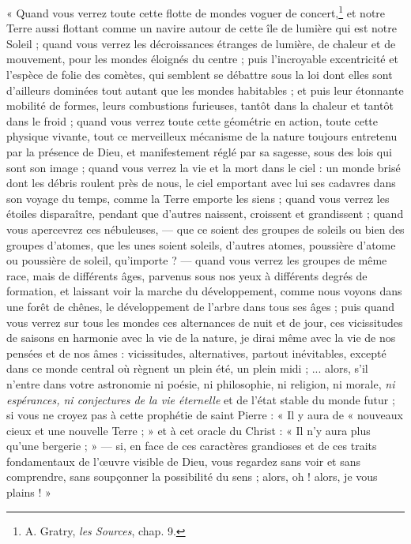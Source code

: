 \documentclass[a4paper, 11pt, oneside]{article}
\begin{document}
« Quand vous verrez toute cette flotte de mondes voguer de concert,\footnote{A. Gratry, \emph{les Sources}, chap. 9.} et notre Terre aussi flottant comme un navire autour de cette île de lumière qui est notre Soleil ; quand vous verrez les décroissances étranges de lumière, de chaleur et de mouvement, pour les mondes éloignés du centre ; puis l'incroyable excentricité et l'espèce de folie des comètes, qui semblent se débattre sous la loi dont elles sont d'ailleurs dominées tout autant que les mondes habitables ; et puis leur étonnante mobilité de formes, leurs combustions furieuses, tantôt dans la chaleur et tantôt dans le froid ; quand vous verrez toute cette géométrie en action, toute cette physique vivante, tout ce merveilleux mécanisme de la nature toujours entretenu par la présence de Dieu, et manifestement réglé par sa sagesse, sous des lois qui sont son image ; quand vous verrez la vie et la mort dans le ciel : un monde brisé dont les débris roulent près de nous, le ciel emportant avec lui ses cadavres dans son voyage du temps, comme la Terre emporte les siens ; quand vous verrez les étoiles disparaître, pendant que d'autres naissent, croissent et grandissent ; quand vous apercevrez ces nébuleuses, --- que ce soient des groupes de soleils ou bien des groupes d'atomes, que les unes soient soleils, d'autres atomes, poussière d'atome ou poussière de soleil, qu'importe ? --- quand vous verrez les groupes de même race, mais de différents âges, parvenus sous nos yeux à différents degrés de formation, et laissant voir la marche du développement, comme nous voyons dans une forêt de chênes, le développement de l'arbre dans tous ses âges ; puis quand vous verrez sur tous les mondes ces alternances de nuit et de jour, ces vicissitudes de saisons en harmonie avec la vie de la nature, je dirai même avec la vie de nos pensées et de nos âmes : vicissitudes, alternatives, partout inévitables, excepté dans ce monde central où règnent un plein été, un plein midi ; ... alors, s'il n'entre dans votre astronomie ni poésie, ni philosophie, ni religion, ni morale, \emph{ni espérances, ni conjectures de la vie éternelle} et de l'état stable du monde futur ; si vous ne croyez pas à cette prophétie de saint Pierre : « Il y aura de « nouveaux cieux et une nouvelle Terre ; » et à cet oracle du Christ : « Il n'y aura plus qu'une bergerie ; » --- si, en face de ces caractères grandioses et de ces traits fondamentaux de l'œuvre visible de Dieu, vous regardez sans voir et sans comprendre, sans soupçonner la possibilité du sens ; alors, oh ! alors, je vous plains ! »
\end{document}
